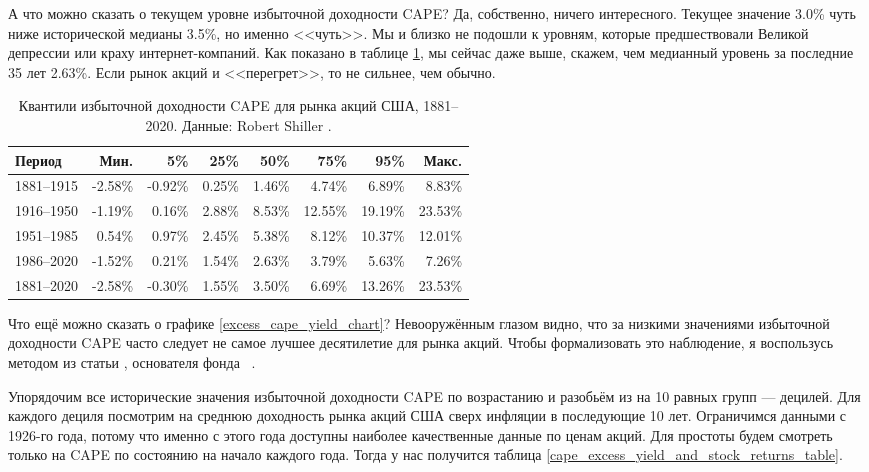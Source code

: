 А что можно сказать о текущем уровне избыточной доходности CAPE? Да, собственно, ничего интересного. Текущее значение 3.0\% чуть ниже исторической медианы 3.5\%, но именно <<чуть>>. Мы и близко не подошли к уровням, которые предшествовали Великой депрессии или краху интернет-компаний. Как показано в таблице \ref{cape_excess_yield_quantiles_table}, мы сейчас даже выше, скажем,  чем медианный уровень за последние 35 лет 2.63\%. Если рынок акций и <<перегрет>>, то не сильнее, чем обычно.

\begin{table}[ht]
\centering
\begin{tabular}{l|r|r|r|r|r|r|r}
Период       & Мин.      & 5\%       & 25\%   & 50\%    & 75\%      & 95\% & Макс. \\ \hline
1881--1915 & -2.58\% & -0.92\% & 0.25\% & 1.46\% &   4.74\% & 6.89\%  & 8.83\% \\
1916--1950 & -1.19\% &  0.16\% & 2.88\% & 8.53\% & 12.55\%  & 19.19\% & 23.53\% \\
1951--1985 &  0.54\% &  0.97\% & 2.45\% & 5.38\% &   8.12\%  & 10.37\% & 12.01\% \\
1986--2020 & -1.52\% &  0.21\% & 1.54\% & 2.63\% &   3.79\%  & 5.63\%  & 7.26\% \\ \hline
1881--2020 & -2.58\% & -0.30\% & 1.55\% & 3.50\% &   6.69\%  & 13.26\% & 23.53\%
\end{tabular}
\caption{Квантили избыточной доходности CAPE для рынка акций США, 1881--2020. Данные: Robert Shiller \cite{shillerOnline}.}
\label{cape_excess_yield_quantiles_table}
\end{table}

Что ещё можно сказать о графике \ref{excess_cape_yield_chart}? Невооружённым глазом видно, что за низкими значениями избыточной доходности CAPE часто следует не самое лучшее десятилетие для рынка акций. Чтобы формализовать это наблюдение, я воспользусь методом из статьи , основателя фонда \ \cite{asness2012old}.

Упорядочим все исторические значения избыточной доходности CAPE по возрастанию и разобьём из на 10 равных групп --- децилей. Для каждого дециля посмотрим на среднюю доходность рынка акций США сверх инфляции в последующие 10 лет. Ограничимся данными с 1926-го года, потому что именно с этого года доступны наиболее качественные данные по ценам акций. Для простоты будем смотреть только на CAPE по состоянию на начало каждого года. Тогда у нас получится таблица \ref{cape_excess_yield_and_stock_returns_table}.

